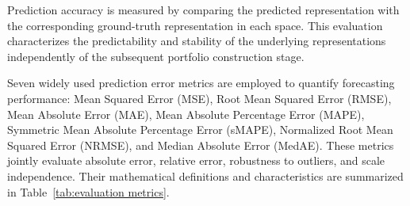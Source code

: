 \documentclass[preprint,12pt]{elsarticle}
\theoremstyle{plain}
\theoremstyle{definition}
\begin{document}
Prediction accuracy is measured by comparing the predicted representation with the corresponding ground-truth representation in each space. This evaluation characterizes the predictability and stability of the underlying representations independently of the subsequent portfolio construction stage.

Seven widely used prediction error metrics are employed to quantify forecasting performance: Mean Squared Error (MSE), Root Mean Squared Error (RMSE), Mean Absolute Error (MAE), Mean Absolute Percentage Error (MAPE), Symmetric Mean Absolute Percentage Error (sMAPE), Normalized Root Mean Squared Error (NRMSE), and Median Absolute Error (MedAE). These metrics jointly evaluate absolute error, relative error, robustness to outliers, and scale independence. Their mathematical definitions and characteristics are summarized in Table~\ref{tab:evaluation metrics}.
\end{document}
